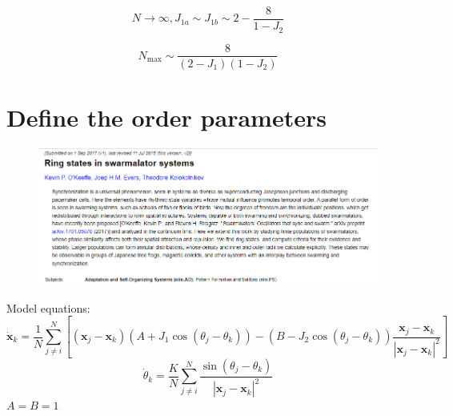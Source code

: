 \documentclass[10pt,aspectratio=43,mathserif,table]{beamer}
\begin{document}
\begin{frame}
    $$
    N\rightarrow \infty , J_{1a}\sim J_{1b}\sim 2-\frac{8}{1-J_2}
    $$

    $$
    N_{\max}\sim \frac{8}{\left( 2-J_1 \right) \left( 1-J_2 \right)}
    $$


\end{frame}

\section{Define the order parameters}

\begin{frame}
    \begin{figure}
        \centering
        \includegraphics[width=\textwidth]{title.png}
    \end{figure}
\end{frame}

\begin{frame}
    Model equations:
    {
    \small
    $$
    \dot{\mathbf{x}}_k=\frac{1}{N}\sum_{j\ne i}^N{\left[ \left( \mathbf{x}_j-\mathbf{x}_k \right) \left( A+J_1\cos \left( \theta _j-\theta _k \right) \right) -\left( B-J_2\cos \left( \theta _j-\theta _k \right) \right) \frac{\mathbf{x}_j-\mathbf{x}_k}{\left| \mathbf{x}_j-\mathbf{x}_k \right|^2} \right]}
    $$
    $$
    \dot{\theta}_k=\frac{K}{N}\sum_{j\ne i}^N{\frac{\sin \left( \theta _j-\theta _k \right)}{\left| \mathbf{x}_j-\mathbf{x}_k \right|^2}}
    $$
    }
    $A=B=1$
\end{frame}
\end{document}
